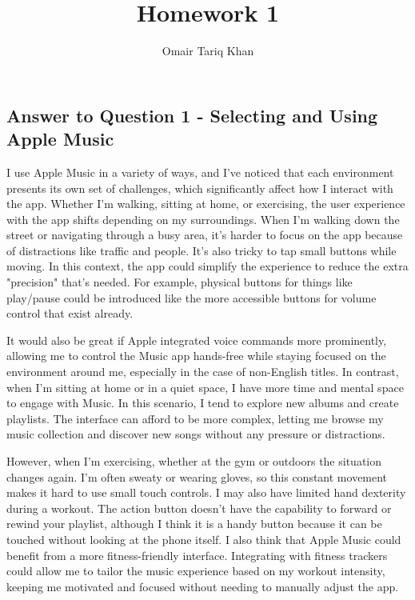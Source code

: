 \documentclass[
	letterpaper, %
]{jdf}
\author{Omair Tariq Khan}
\title{Homework 1}
\begin{document}

\maketitle
\hfill \break
\hfill \break


\subsection{Answer to Question 1 - Selecting and Using Apple Music}
I use Apple Music in a variety of ways, and I've noticed that each environment presents its own set of challenges, which significantly affect how I interact with the app. Whether I’m walking, sitting at home, or exercising, the user experience with the app shifts depending on my surroundings. When I’m walking down the street or navigating through a busy area, it’s harder to focus on the app because of distractions like traffic and people. It’s also tricky to tap small buttons while moving. In this context, the app could simplify the experience to reduce the extra "precision" that's needed. For example, physical buttons for things like play/pause could be introduced like the more accessible buttons for volume control that exist already. 

It would also be great if Apple integrated voice commands more prominently, allowing me to control the Music app hands-free while staying focused on the environment around me, especially in the case of non-English titles. In contrast, when I’m sitting at home or in a quiet space, I have more time and mental space to engage with Music. In this scenario, I tend to explore new albums and create playlists. The interface can afford to be more complex, letting me browse my music collection and discover new songs without any pressure or distractions. 

However, when I’m exercising, whether at the gym or outdoors the situation changes again. I’m often sweaty or wearing gloves, so this constant movement makes it hard to use small touch controls. I may also have limited hand dexterity during a workout. The action button doesn't have the capability to forward or rewind your playlist, although I think it is a handy button because it can be touched without looking at the phone itself. I also think that Apple Music could benefit from a more fitness-friendly interface. Integrating with fitness trackers could allow me to tailor the music experience based on my workout intensity, keeping me motivated and focused without needing to manually adjust the app.
\end{document}
